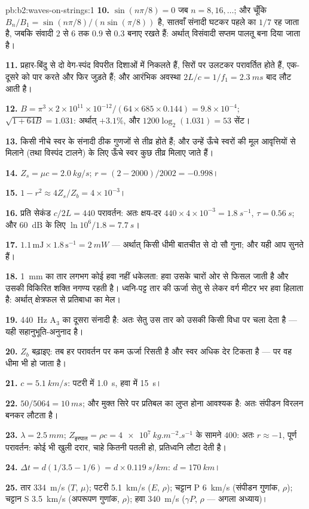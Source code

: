 \begin{solution}{pb:b2:waves-on-strings:1}
\textbf{10.} $\sin(n\pi/8) = 0$ जब $n = 8, 16, \dots$; और चूँकि $B_n/B_1 =
\sin(n\pi/8)/(n\sin(\pi/8))$ है, सातवाँ संनादी घटकर पहले का $1/7$ रह जाता है,
जबकि संवादी $2$ से $6$ तक $0.9$ से $0.3$ बनाए रखते हैं: अर्थात् विसंवादी
सप्तम पालतू बना दिया जाता है।

\textbf{11.} प्रहार-बिंदु से दो वेग-स्पंद विपरीत दिशाओं में
निकलते हैं, सिरों पर उलटकर परावर्तित होते हैं, एक-दूसरे को पार करते और फिर जुड़ते हैं; और
आरंभिक अवस्था $2L/c = 1/f_1 = \qty{2.3}{ms}$ बाद लौट आती है।

\textbf{12.} $B = \pi^3 \times 2 \times 10^{11} \times 10^{-12}/(64 \times 685 \times 0.144) =
9.8 \times 10^{-4}$; $\sqrt{1 + 64B} = 1.031$: अर्थात् $+3.1\%$, और $1200\log_2(1.031) = 53$ सेंट।

\textbf{13.} किसी नीचे स्वर के संनादी ठीक गुणजों से तीव्र होते हैं;
और उन्हें ऊँचे स्वरों की मूल आवृत्तियों से मिलाने (तथा विस्पंद टालने) के लिए
ऊँचे स्वर कुछ तीव्र मिलाए जाते हैं।

\textbf{14.} $Z_s = \mu c = \qty{2.0}{kg/s}$; $r = (2 - 2000)/2002 = -0.998$।

\textbf{15.} $1 - r^2 \approx 4Z_s/Z_b = 4 \times 10^{-3}$।

\textbf{16.} प्रति सेकंड $c/2L = 440$ परावर्तन: अतः क्षय-दर $440 \times 4 \times
10^{-3} = \qty{1.8}{s^{-1}}$, $\tau = \qty{0.56}{s}$; और \qty{60}{dB} के लिए
$\ln10^6/1.8 = \qty{7.7}{s}$।

\textbf{17.} $1.1\,\text{mJ} \times 1.8\,\text{s}^{-1} = \qty{2}{mW}$ --- अर्थात् किसी धीमी बातचीत
से दो सौ गुना; और यही आप सुनते हैं।

\textbf{18.} \qty{1}{mm} का तार लगभग कोई हवा नहीं धकेलता: हवा उसके चारों ओर से
फिसल जाती है और उसकी विकिरित शक्ति नगण्य रहती है। ध्वनि-पट्ट
तार की ऊर्जा सेतु से लेकर वर्ग मीटर भर हवा हिलाता है:
अर्थात् क्षेत्रफल से प्रतिबाधा का मेल।

\textbf{19.} \qty{440}{Hz} A$_3$ का दूसरा संनादी है: अतः सेतु
उस तार को उसकी किसी विधा पर चला देता है --- यही सहानुभूति-अनुनाद है।

\textbf{20.} $Z_b$ बढ़ाइए: तब हर परावर्तन पर कम ऊर्जा रिसती है और स्वर अधिक
देर टिकता है --- पर वह धीमा भी हो जाता है।

\textbf{21.} $c = \qty{5.1}{km/s}$: पटरी में \qty{1.0}{s}, हवा में \qty{15}{s}।

\textbf{22.} $50/5064 = \qty{10}{ms}$; और मुक्त सिरे पर प्रतिबल का लुप्त होना
आवश्यक है: अतः संपीडन विरलन बनकर लौटता है।

\textbf{23.} $\lambda = \qty{2.5}{mm}$; $Z_{\text{इस्पात}} = \rho c = \qty{4e7}{kg.m^{-2}.s^{-1}}$
के सामने $400$: अतः $r \approx -1$, पूर्ण परावर्तन: कोई भी खुली दरार, चाहे कितनी
पतली हो, प्रतिध्वनि लौटा देती है।

\textbf{24.} $\Delta t = d(1/3.5 - 1/6) = d \times \qty{0.119}{s/km}$: $d = \qty{170}{km}$।

\textbf{25.} तार \qty{334}{m/s} ($T$, $\mu$); पटरी \qty{5.1}{km/s} ($E$, $\rho$);
चट्टान P \qty{6}{km/s} (संपीडन गुणांक, $\rho$); चट्टान S \qty{3.5}{km/s}
(अपरूपण गुणांक, $\rho$); हवा \qty{340}{m/s} ($\gamma P$, $\rho$ --- अगला अध्याय)।
\end{solution}
